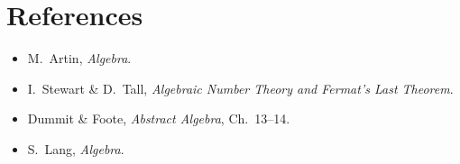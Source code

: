 \section*{References}
\begin{itemize}
  \item M.\ Artin, \emph{Algebra}.
  \item I.\ Stewart \& D.\ Tall, \emph{Algebraic Number Theory and Fermat's Last Theorem}.
  \item Dummit \& Foote, \emph{Abstract Algebra}, Ch.\ 13--14.
  \item S.\ Lang, \emph{Algebra}.
\end{itemize}
